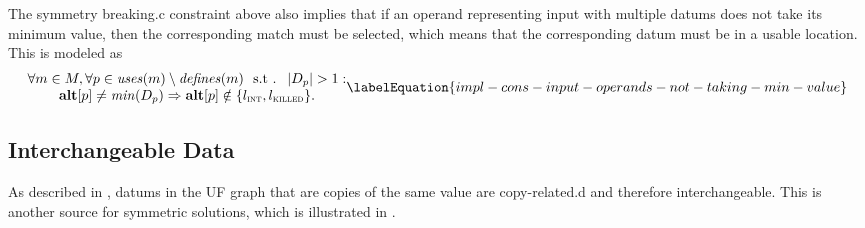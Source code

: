The \gls{symmetry breaking.c} \gls{constraint} above also implies that if an
\gls{operand} representing input with multiple \glspl{datum} does not take its
minimum value, then the corresponding \gls{match} must be selected, which means
that the corresponding \gls{datum} must be in a usable \gls{location}.
%
This is modeled as
\begin{equation}
  \begin{array}{@{}c@{}}
    \forall m \in \mMatchSet,
    \forall p \in \mUses(m) \setminus \mDefines(m)
    \text{ \st }
    \mCard{\mDataSet[p]} > 1 : \\
    \mVar{alt}[p] \neq \mMin(\mDataSet[p])
    \mImp
    \mVar{alt}[p] \notin \mSet{\mIntLocation, \mKilledLocation}.
  \end{array}
  \labelEquation{impl-cons-input-operands-not-taking-min-value}
\end{equation}


\subsection{Interchangeable Data}

As described in , \glspl{datum} in the \gls{UF
  graph} that are copies of the same value are \gls{copy-related.d} and
therefore interchangeable.
%
This is another source for symmetric \glspl{solution}, which is illustrated in
.


